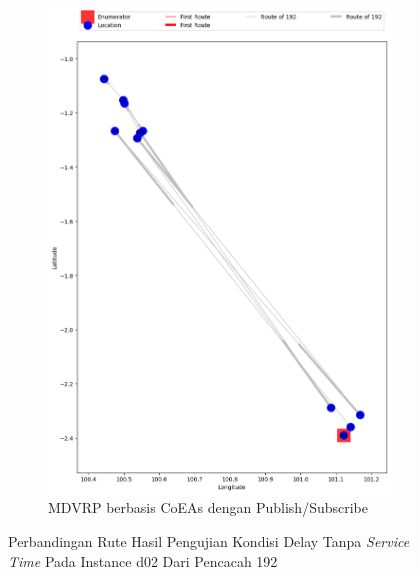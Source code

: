 \begin{figure}[H]\ContinuedFloat
	\centering
	\begin{subfigure}[t]{\textwidth}
		\centering
		\includegraphics[width=\textwidth]{Resources/Images/delayed_2/real_m15_n100_delayed_2_192_pubsub_coes}
		\caption{MDVRP berbasis CoEAs dengan Publish/Subscribe}
		\label{fig:real_m15_n100_delayed_2_192_pubsub_coes}
	\end{subfigure}
	\caption{Perbandingan Rute Hasil Pengujian Kondisi Delay Tanpa \textit{Service Time} Pada Instance d02 Dari Pencacah 192}
	\label{fig:real_m15_n100_delayed_2_192_contd}
\end{figure}



